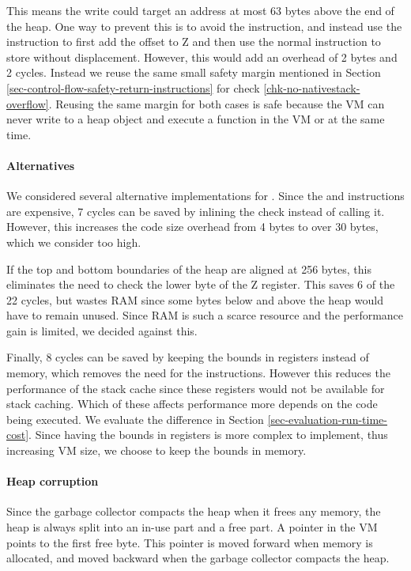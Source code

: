 This means the write could target an address at most 63 bytes above the end of the heap. One way to prevent this is to avoid the  instruction, and instead use the  instruction to first add the offset to Z and then use the normal  instruction to store without displacement. However, this would add an overhead of 2 bytes and 2 cycles. Instead we reuse the same small safety margin mentioned in Section \ref{sec-control-flow-safety-return-instructions} for check \ref{chk-no-nativestack-overflow}. Reusing the same margin for both cases is safe because the VM can never write to a heap object and execute a function in the VM or  at the same time.

\paragraph{Alternatives}
We considered several alternative implementations for . Since the  and  instructions are expensive, 7 cycles can be saved by inlining the check instead of calling it. However, this increases the code size overhead from 4 bytes to over 30 bytes, which we consider too high.

If the top and bottom boundaries of the heap are aligned at 256 bytes, this eliminates the need to check the lower byte of the Z register. This saves 6 of the 22 cycles, but wastes RAM since some bytes below and above the heap would have to remain unused. Since RAM is such a scarce resource and the performance gain is limited, we decided against this.

Finally, 8 cycles can be saved by keeping the bounds in registers instead of memory, which removes the need for the  instructions. However this reduces the performance of the stack cache since these registers would not be available for stack caching. Which of these affects performance more depends on the code being executed. We evaluate the difference in Section \ref{sec-evaluation-run-time-cost}. Since having the bounds in registers is more complex to implement, thus increasing VM size, we choose to keep the bounds in memory.

\paragraph{Heap corruption}
Since the garbage collector compacts the heap when it frees any memory, the heap is always split into an in-use part and a free part. A pointer in the VM points to the first free byte. This pointer is moved forward when memory is allocated, and moved backward when the garbage collector compacts the heap.

